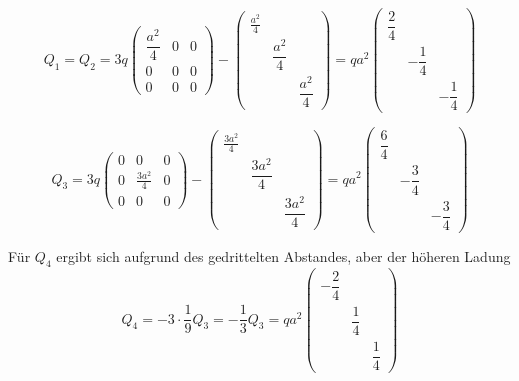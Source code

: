 \documentclass[a4paper,german,12pt,smallheadings]{scrartcl}
\begin{document}
\begin{equation}
  Q_1 = Q_2 = 3q\begin{pmatrix}
    \dfrac{a^2}{4} & 0 & 0 \\
    0 & 0 & 0 \\
    0 & 0 & 0
  \end{pmatrix} - \begin{pmatrix}
   \frac{a^2}{4} &       &       \\
                 & \dfrac{a^2}{4} &       \\
                 &       & \dfrac{a^2}{4}
  \end{pmatrix}
  =
  qa^2\begin{pmatrix}
   \dfrac{2}{4} &       &       \\
                 & -\dfrac{1}{4} &       \\
                 &       & -\dfrac{1}{4}
  \end{pmatrix}
\end{equation}

\begin{equation}
  Q_3 = 3q\begin{pmatrix}
    0 & 0 & 0 \\
    0 & \frac{3a^2}{4} & 0 \\
    0 & 0 & 0
  \end{pmatrix} - \begin{pmatrix}
   \frac{3a^2}{4} &       &       \\
                 & \dfrac{3a^2}{4} &       \\
                 &       & \dfrac{3a^2}{4}
  \end{pmatrix}
  =
  qa^2\begin{pmatrix}
   \dfrac{6}{4} &       &       \\
                 & -\dfrac{3}{4} &       \\
                 &       & -\dfrac{3}{4}
  \end{pmatrix}
\end{equation}

Für $Q_4$ ergibt sich aufgrund des gedrittelten Abstandes, aber der höheren Ladung
\begin{equation}
  Q_4 = -3 \cdot \frac{1}{9} Q_3 = -\frac{1}{3} Q_3 = 
    qa^2\begin{pmatrix}
    -\dfrac{2}{4} &       &       \\
                    & \dfrac{1}{4} &       \\
                    &       & \dfrac{1}{4}
    \end{pmatrix}
\end{equation}
\end{document}
